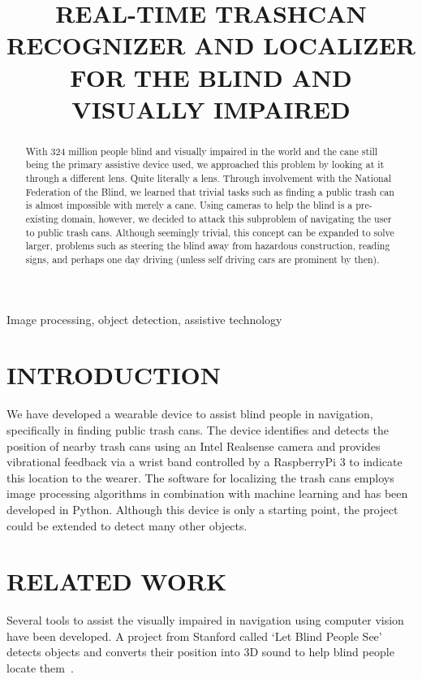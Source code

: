 \documentclass{article}
\title{REAL-TIME TRASHCAN RECOGNIZER AND LOCALIZER FOR THE BLIND AND VISUALLY IMPAIRED}
\begin{document}
%
\maketitle
%
\begin{abstract}
With 324 million people blind and visually impaired in the world and the cane still being the primary assistive device used, we approached this problem by looking at it through a different lens. Quite literally a lens. Through involvement with the National Federation of the Blind, we learned that trivial tasks such as finding a public trash can is almost impossible with merely a cane. Using cameras to help the blind is a pre-existing domain, however, we decided to attack this subproblem of navigating the user to public trash cans. Although seemingly trivial, this concept can be expanded to solve larger, problems such as steering the blind away from hazardous construction, reading signs, and perhaps one day driving (unless self driving cars are prominent by then).
\end{abstract}
%
\begin{keywords}
Image processing, object detection, assistive technology
\end{keywords}
%
\section{INTRODUCTION}
\label{sec:intro}

We have developed a wearable device to assist blind people in navigation, specifically in finding public trash cans. The device identifies and detects the position of nearby trash cans using an Intel Realsense camera and provides vibrational feedback via a wrist band controlled by a RaspberryPi 3 to indicate this location to the wearer. The software for localizing the trash cans employs image processing algorithms in combination with machine learning and has been developed in Python. Although this device is only a starting point, the project could be extended to detect many other objects.

\section{RELATED WORK}
\label{sec:research}
Several tools to assist the visually impaired in navigation using computer vision have been developed. 
A project from Stanford called ‘Let Blind People See’ detects objects and converts their position into 3D sound to help blind people locate them~\cite{LetBlind}.
\end{document}
